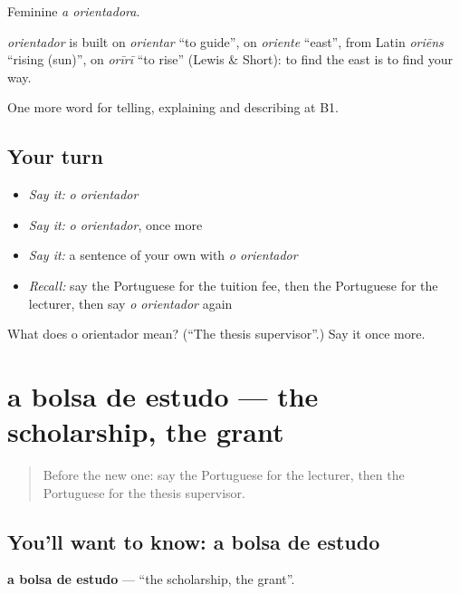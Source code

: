 Feminine \emph{a orientadora}.

\begin{cousinweb}
\emph{orientador} is built on \emph{orientar} \textquotedblleft{}to guide\textquotedblright{}, on \emph{oriente} \textquotedblleft{}east\textquotedblright{}, from Latin \emph{oriēns} \textquotedblleft{}rising (sun)\textquotedblright{}, on \emph{orīrī} \textquotedblleft{}to rise\textquotedblright{} (Lewis \& Short): to find the east is to find your way.
\end{cousinweb}

\begin{grammarlens}[title={What you've built}]
One more word for telling, explaining and describing at B1.
\end{grammarlens}

\subsection*{Your turn}
\begin{itemize}
\raggedright
  \item \emph{Say it:} \emph{o orientador}
  \item \emph{Say it:} \emph{o orientador}, once more
  \item \emph{Say it:} a sentence of your own with \emph{o orientador}
  \item \emph{Recall:} say the Portuguese for the tuition fee, then the Portuguese for the lecturer, then say \emph{o orientador} again
\end{itemize}

\begin{tcolorbox}[breakable,colback=teal!4,colframe=teal!35!black,title={Before you move on}]
What does o orientador mean? (\textquotedblleft{}The thesis supervisor\textquotedblright{}.) Say it once more.
\end{tcolorbox}
\section[a bolsa de estudo]{a bolsa de estudo — the scholarship, the grant}

\label{lesson:PT-C377-bolsa-de-estudo}



\begin{quote}
Before the new one: say the Portuguese for the lecturer, then the Portuguese for the thesis supervisor.
\end{quote}

\subsection*{You'll want to know: a bolsa de estudo}
\textbf{a bolsa de estudo} — \textquotedblleft{}the scholarship, the grant\textquotedblright{}.

